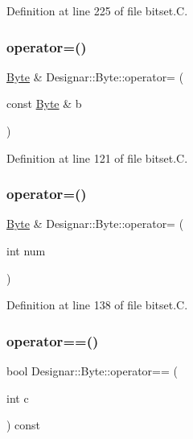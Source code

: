 Definition at line 225 of file bitset.\+C.

\mbox{\label{class_designar_1_1_byte_ab139736eebd931cb54f89fa2b01964fb}} 
\subsubsection{\texorpdfstring{operator=()}{operator=()}\hspace{0.1cm}{\footnotesize\ttfamily [1/2]}}
{\footnotesize\ttfamily \hyperlink{class_designar_1_1_byte}{Byte} \& Designar\+::\+Byte\+::operator= (\begin{DoxyParamCaption}\item[{const \hyperlink{class_designar_1_1_byte}{Byte} \&}]{b }\end{DoxyParamCaption})}



Definition at line 121 of file bitset.\+C.

\mbox{\label{class_designar_1_1_byte_a1bc5154efe3f2ca906bbdd8c1d9b56ff}} 
\subsubsection{\texorpdfstring{operator=()}{operator=()}\hspace{0.1cm}{\footnotesize\ttfamily [2/2]}}
{\footnotesize\ttfamily \hyperlink{class_designar_1_1_byte}{Byte} \& Designar\+::\+Byte\+::operator= (\begin{DoxyParamCaption}\item[{int}]{num }\end{DoxyParamCaption})}



Definition at line 138 of file bitset.\+C.

\mbox{\label{class_designar_1_1_byte_aefd8f12d0f09d688f2977d86e387eabd}} 
\subsubsection{\texorpdfstring{operator==()}{operator==()}}
{\footnotesize\ttfamily bool Designar\+::\+Byte\+::operator== (\begin{DoxyParamCaption}\item[{int}]{c }\end{DoxyParamCaption}) const}



